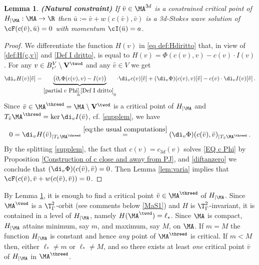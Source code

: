 \documentclass[11pt,a4paper,reqno]{article}
\numberwithin{equation}{section}
\newtheorem{lemma}[theorem]{Lemma}
\theoremstyle{definition}
\begin{document}
\begin{lemma}\label{thm:Lagrange}
   {\bf  (Natural constraint)} If $ \bar v \in {\MA^{3d} } $ is a constrained critical point of $H_{|\MA} : \MA \to \R $ 
    then $ \bar u := \bar v+  w( c(\bar v), \bar v)$ is a 3d-Stokes wave solution of $\cF(c(\bar v), \bar u)=0 $ 
    with momentum $ \cI (\bar u) = a $.
\end{lemma}


\begin{proof}
        We differentiate the function $ H(v) $  in \eqref{eq def:Hdiritto} 
        that,  
        in view of \eqref{def:H(c,v)} and \eqref{Def I dritto}, is equal to 
         $H(v)=\Phi(c(v),v)-c(v)\cdot I(v)$.
        For any $v\in B_{r'}^V\setminus {\bf V}^{\twod}$ and any $\hat v\in V$ we get
\begin{equation}\label{eq:the usual computations}
            \di_v H(v)[\hat v]=\underbrace{\big(\partial_c\Phi(c(v),v)-I(v)\big)}_{\stackrel{\eqref{partial c Phi},\eqref{Def I dritto}}=0}\cdot \di_v c(v)[\hat v]+(\di_v \Phi)(c(v),v)[\hat v]-c(v)\cdot \di_v I(v)[\hat v]\, .
        \end{equation}
Since $\bar v \in \MA^{\threed} = \MA\setminus {\bf V}^{\twod} $ is a  critical point of $H_{|\MA} $ 
and $ T_{\bar v}\MA^{\threed} = \ker \di_v I (\bar v) $, cf. \eqref{supplem}, we have
\begin{equation}\label{diftanzero}
   0 = \di_vH(\bar v)_{|T_{\bar v}\MA^{\threed}} \stackrel{\eqref{eq:the usual computations}} = 
   (\di_v\Phi)(c(\bar v),\bar v)_{|T_{\bar v}\MA^{\threed}} \, . 
\end{equation}
   By the splitting \eqref{supplem}, the fact that  
   $ c(v) = c_{3d} (v) $ solves \eqref{EQ c Phi} by   Proposition \ref{Construction of c close and away from PJ},  and
\eqref{diftanzero} 
        we conclude that  $(\di_v\Phi)(c(\bar v), \bar v) =  0 $. Then 
        Lemma \ref{lem:varia} implies that 
$\cF(c( \bar v), \bar v+ 
w(c(\bar v ), \bar v)  )=0$.
\end{proof}

    By Lemma \ref{thm:Lagrange}, it is enough to find a critical point $\bar v\in \MA^{\threed}$ of $H_{|\MA} $.
    Since $\MA^{\twod}$
    is a 
    $ \T^2_\Gamma$-orbit (see  comments below \eqref{MaS1}) and $ H $ is $\T^2_\Gamma$-invariant,  it is contained in a level of $H_{|\MA}$, namely 
    $H (\MA^{\twod} ) = \ell_* $. 
    Since $ \MA $  is compact, $ H_{|\MA} $ attains 
    minimum, say $m $, and  maximum, say $ M $,  on $\MA $. 
    If $m=M$ the function  $ H_{|\MA} $ is constant and hence {\it any}  point of $ \MA^{\threed}$ is critical.
    If $m<M$ then, either  $\ell_* \not=m$ or 
    $ \ell_* \not= M $,  and so 
 there exists at least {\it one}  critical  
 point $ \bar v $ of $ H_{|\MA} $  in $\MA^{\threed}$. 
\end{document}
